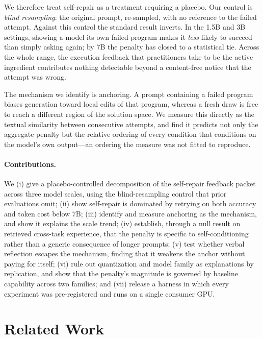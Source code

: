We therefore treat self-repair as a treatment requiring a placebo. Our control
is \emph{blind resampling}: the original prompt, re-sampled, with no reference
to the failed attempt. Against this control the standard result inverts. In the
1.5B and 3B settings, showing a model its own failed program makes it
\emph{less} likely to succeed than simply asking again; by 7B the penalty has
closed to a statistical tie. Across the whole range, the execution feedback
that practitioners take to be the active ingredient contributes nothing
detectable beyond a content-free notice that the attempt was wrong.

The mechanism we identify is anchoring. A prompt containing a failed program
biases generation toward local edits of that program, whereas a fresh draw is
free to reach a different region of the solution space. We measure this
directly as the textual similarity between consecutive attempts, and find it
predicts not only the aggregate penalty but the relative ordering of every
condition that conditions on the model's own output---an ordering the measure
was not fitted to reproduce.

\paragraph{Contributions.}
We (i) give a placebo-controlled decomposition of the self-repair feedback
packet across three model scales, using the blind-resampling control that prior
evaluations omit; (ii) show self-repair is dominated by retrying on both
accuracy and token cost below 7B; (iii) identify and measure anchoring as the
mechanism, and show it explains the scale trend; (iv) establish, through a null
result on retrieved cross-task experience, that the penalty is specific to
self-conditioning rather than a generic consequence of longer prompts; (v)
test whether verbal reflection escapes the mechanism, finding that it weakens
the anchor without paying for itself; (vi) rule out quantization and model
family as explanations by replication, and show that the penalty's magnitude is
governed by baseline capability across two families; and (vii) release a
harness in which every experiment was pre-registered and runs on a single
consumer GPU.

\section{Related Work}
\label{sec:related}


